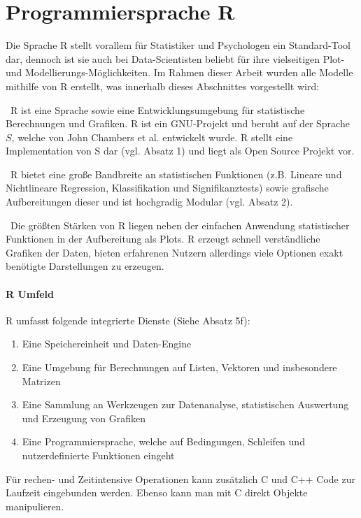 \section{Programmiersprache R}
\label{sec:R}
Die Sprache R stellt vorallem für Statistiker und Psychologen ein Standard-Tool dar, dennoch ist sie auch bei Data-Scientisten beliebt für ihre vielseitigen Plot- und Modellierungs-Möglichkeiten. Im Rahmen dieser Arbeit wurden alle Modelle mithilfe von R erstellt, was innerhalb dieses Abschnittes vorgestellt wird:

~\newline R ist eine Sprache sowie eine Entwicklungsumgebung für statistische Berechnungen und Grafiken. R ist ein GNU-Projekt und beruht auf der Sprache $S$, welche von John Chambers et al. entwickelt wurde. R stellt eine Implementation von S dar (vgl. \cite{RProject} Absatz 1) und liegt als Open Source Projekt vor.

~\newline R bietet eine große Bandbreite an statistischen Funktionen (z.B. Lineare und Nichtlineare Regression, Klassifikation und Signifikanztests) sowie grafische Aufbereitungen dieser und ist hochgradig Modular (vgl. \cite{RProject} Absatz 2). 

~\newline Die größten Stärken von R liegen neben der einfachen Anwendung statistischer Funktionen in der Aufbereitung als Plots. R erzeugt schnell verständliche Grafiken der Daten, bieten erfahrenen Nutzern allerdings viele Optionen exakt benötigte Darstellungen zu erzeugen. 

\paragraph{ R Umfeld} 
R umfasst folgende integrierte Dienste (Siehe \cite{RProject} Absatz 5f):
\begin{enumerate}
	\item Eine Speichereinheit und Daten-Engine
	\item Eine Umgebung für Berechnungen auf Listen, Vektoren und insbesondere Matrizen
	\item Eine Sammlung an Werkzeugen zur Datenanalyse, statistischen Auswertung und Erzeugung von Grafiken
	\item Eine Programmiersprache, welche auf Bedingungen, Schleifen und nutzerdefinierte Funktionen eingeht
\end{enumerate}

Für rechen- und Zeitintensive Operationen kann zusätzlich C und C++ Code zur Laufzeit eingebunden werden. Ebenso kann man mit C direkt Objekte manipulieren. 


